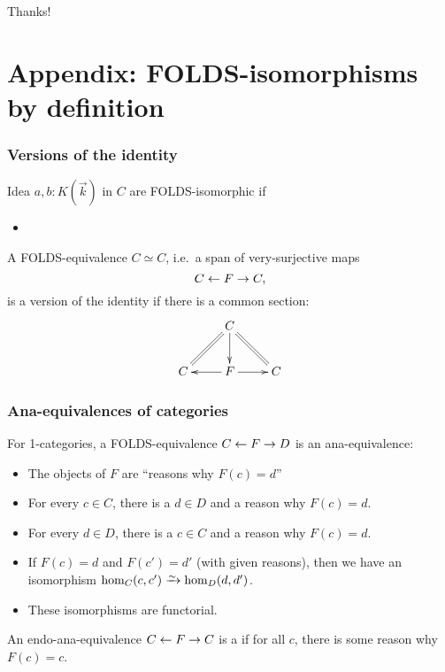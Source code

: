 \documentclass{beamer}
\begin{document}
\begin{frame}
  \begin{center}
    Thanks!
  \end{center}
\end{frame}

\appendix

\section{Appendix: FOLDS-isomorphisms by definition}
\label{sec:univalent-folds}

\begin{frame}
  \frametitle{Versions of the identity}
  \begin{block}{Idea}
    $a,b:K(\vec{k})$ in $C$ are \alert<1>{FOLDS-isomorphic} if
    \begin{itemize}
    \item {}
    \end{itemize}
  \end{block}
  \pause\pause\pause
  \begin{definition}
    A FOLDS-equivalence $C\simeq C$, i.e.\ a span of very-surjective maps
    \[ C \leftarrow F \to C, \]
    is \alert{a version of the identity} if there is a common section:
    \[ \xymatrix{ &C \ar[d] \ar@{=}[dl] \ar@{=}[dr] \\ C & F \ar[l] \ar[r] & C } \]
  \end{definition}
\end{frame}

\begin{frame}
  \frametitle{Ana-equivalences of categories}
  \begin{example}
    For 1-categories, a FOLDS-equivalence $C \leftarrow F \to D$ is an \alert<1>{ana-equivalence}:
    \begin{itemize}
    \item The objects of $F$ are ``reasons why $F(c) = d$''
    \item For every $c\in C$, there is a $d\in D$ and a reason why $F(c)=d$.
    \item For every $d\in D$, there is a $c\in C$ and a reason why $F(c)=d$.
    \item If $F(c)=d$ and $F(c')=d'$ (with given reasons), then we have an isomorphism $\hom_C(c,c') \toiso \hom_D(d,d')$.
    \item These isomorphisms are functorial.
    \end{itemize}
  \end{example}
  An endo-ana-equivalence $C \leftarrow F \to C$ is a  if for all $c$, there is some reason why $F(c)=c$.
\end{frame}
\end{document}
